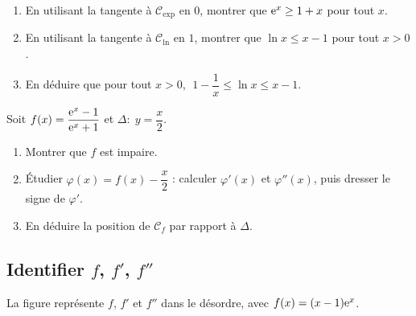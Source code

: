\begin{enumerate}
	\item En utilisant la tangente à $\mathcal C_{\exp}$ en $0$, montrer que
	$\mathrm{e}^{x}\geq 1+x$ pour tout $x$.
	\item En utilisant la tangente à $\mathcal C_{\ln}$ en $1$, montrer que
	$\ln x\leq x-1$ pour tout $x>0$.
	\item En déduire que pour tout $x>0$, $\;1-\dfrac1x\leq \ln x\leq x-1$.
\end{enumerate}

Soit $f(x)=\dfrac{\mathrm{e}^{x}-1}{\mathrm{e}^{x}+1}$ et $\Delta:\;y=\dfrac{x}{2}$.
\begin{enumerate}
	\item Montrer que $f$ est impaire.
	\item Étudier $\varphi(x)=f(x)-\dfrac{x}{2}$ : calculer $\varphi'(x)$ et
	$\varphi''(x)$, puis dresser le signe de $\varphi'$.
	\item En déduire la position de $\mathcal C_f$ par rapport à $\Delta$.
\end{enumerate}

\subsection{Identifier \texorpdfstring{$f$}{f}, \texorpdfstring{$f'$}{f'}, \texorpdfstring{$f''$}{f''}}

La figure représente $f$, $f'$ et $f''$ dans le désordre, avec
$f(x)=(x-1)\mathrm{e}^{x}$.

\begin{center}
\end{center}


